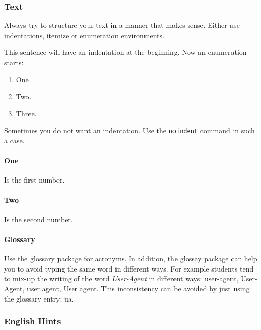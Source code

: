 \subsubsection{Text }
Always try to structure your text in a manner that makes sense. Either use indentations, itemize or enumeration environments.

This sentence will have an indentation at the beginning. Now an enumeration starts:

\begin{enumerate}
\item One.
\item Two.
\item Three.
\end{enumerate}

\noindent Sometimes you do not want an indentation. Use the \texttt{noindent} command in such a case.
\paragraph{One} Is the first number.

\paragraph{Two} Is the second number.

\paragraph{Glossary}
Use the glossary package for acronyms.
In addition, the glossay package can help you to avoid typing the same word in different ways.
For example students tend to mix-up the writing of the word \emph{User-Agent} in different ways: user-agent, User-Agent, user agent, User agent.
This inconsistency can be avoided by just using the glossary entry: \gls{ua}.

\subsubsection{English Hints}

